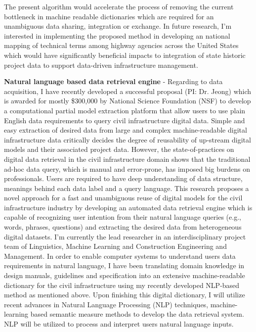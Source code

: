 \documentclass[a4paper,11pt]{article}
\begin{document}
%
The present algorithm would accelerate the process of removing the current bottleneck in machine readable dictionaries which are required for an unambiguous data sharing, integration or exchange.
%
In future research, I'm interested in implementing the proposed method in developing an national mapping of technical terms among highway agencies across the United States which would have significantly beneficial impacts to integration of state historic project data to support data-driven infrastructure management. 
\par
{\bf Natural language based data retrieval engine} - Regarding to data acquisition, I have recently developed a successful proposal (PI: Dr. Jeong) which is awarded for mostly \$300,000 by National Science Foundation (NSF) to develop a computational partial model extraction platform that allow users to use plain English data requirements to query civil infrastructure digital data.
%
Simple and easy extraction of desired data from large and complex machine-readable digital infrastructure data critically decides the degree of reusability of up-stream digital models and their associated project data. 
%
However, the state-of-practices on digital data retrieval in the civil infrastructure domain shows that the traditional ad-hoc data query, which is manual and error-prone, has imposed big burdens on professionals. Users are required to have deep understanding of data structure, meanings behind each data label and a query language. 
%
This research proposes a novel approach for a fast and unambiguous reuse of digital models for the civil infrastructure industry by developing an automated data retrieval engine which is capable of recognizing user intention from their natural language queries (e.g., words, phrases, questions) and extracting the desired data from heterogeneous digital datasets.
%
I'm currently the lead researcher in an interdisciplinary project team of Linguistics, Machine Learning and Construction Engineering and Management. 
%
In order to enable computer systems to understand users data requirements in natural language, I have been translating domain knowledge in design manuals, guidelines and specification into an extensive machine-readable dictionary for the civil infrastructure using my recently developed NLP-based method as mentioned above.
%
Upon finishing this digital dictionary, I will utilize recent advances in Natural Language Processing (NLP) techniques, machine-learning based semantic measure methods to develop the data retrieval system. NLP will be utilized to process and interpret users natural language inputs. 
\end{document}
